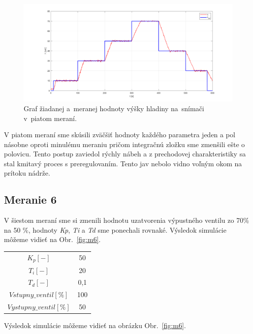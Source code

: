 \documentclass{article}
\begin{document}
\begin{figure}[!htbp]
	\begin{center}
		\includegraphics[width=\textwidth]{./include/meranie5.png}
	\end{center}
	\caption{Graf žiadanej a~meranej hodnoty výšky hladiny na~snímači v~piatom meraní.}
	\label{fig:m5}
\end{figure}

V piatom meraní sme skúsili zväčšiť hodnoty každého parametra jeden a pol násobne oproti minulému meraniu 
pričom integračnú zložku sme zmenšili ešte o polovicu. Tento postup zaviedol rýchly nábeh a z prechodovej
charakteristiky sa stal kmitavý proces s preregulovaním. Tento jav nebolo vidno voľným okom na prítoku nádrže.

\clearpage

\subsection{Meranie 6}
\label{sec:meranie6}

V šiestom meraní sme si zmenili hodnotu uzatvorenia výpustného ventilu zo 70\% na 50 \%, hodnoty
\textit{Kp}, \textit{Ti} a \textit{Td} sme ponechali rovnaké. Výsledok simulácie môžeme vidieť na Obr.~\ref{fig:m6}.

\begin{center}
\begin{tabular}{ |c|c| }
 \hline
 $K_p [-]$ & 50 \\
 $T_i [-]$ & 20 \\
 $T_d [-]$ & 0,1 \\
 \hline
 $Vstupny\_ventil[\%]$ & 100 \\
 $Vystupny\_ventil[\%]$ & 50 \\
 \hline
\end{tabular}
\end{center}

Výsledok simulácie môžeme vidieť na obrázku Obr.~\ref{fig:m6}.
\end{document}

